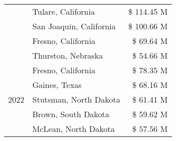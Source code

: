 \begin{tabular}{llr}
 & Tulare, California & \$ 114.45 M \\
 & San Joaquin, California & \$ 100.66 M \\
 & Fresno, California & \$ 69.64 M \\
 & Thurston, Nebraska & \$ 54.66 M \\
\cline{1-3}
\multirow[t]{5}{*}{2022} & Fresno, California & \$ 78.35 M \\
 & Gaines, Texas & \$ 68.16 M \\
 & Stutsman, North Dakota & \$ 61.41 M \\
 & Brown, South Dakota & \$ 59.62 M \\
 & McLean, North Dakota & \$ 57.56 M \\
\cline{1-3}
\bottomrule
\end{tabular}

